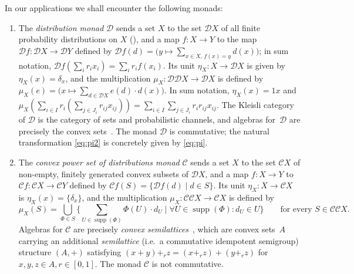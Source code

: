 \documentclass[a4paper, UKenglish, numberwithinsect, thm-restate, cleveref, final]{lipics-v2021}
\theoremstyle{plain}
\theoremstyle{definition}
\newcommand{\C}{\ensuremath{\mathcal{C}}}
\newcommand{\D}{\ensuremath{\mathcal{D}}}
\DeclareMathOperator{\supp}{supp}
\numberwithin{equation}{section}
\begin{document}
\begin{expl}\label{ex:monads}
In our applications we shall encounter the following monads:
\begin{enumerate}[(1)]
\item\label{ex:monads:D} The \emph{distribution monad} $\D$ sends a set $X$ to the set $\D X$
  of all finite probability distributions on $X$ (), and a map $f\colon
  X\to Y$ to the map \mbox{$\D f \colon \D X\to \D Y$} defined by $ \D f(d) =\big(y \mapsto
  \sum_{x\in X,\, f(x) = y} d(x)\big)$; in sum notation, $\D f(\sum_i r_ix_i)=\sum_i r_i
  f(x_i)$. Its unit \mbox{$\eta_X\colon X \to \D X$} is given by $\eta_X(x) = \delta_x$, and
  the multiplication $\mu_X\colon \D\D X \to \D X$ is defined by $\mu_X(e)=\big( x \mapsto \sum_{d\in \D X} e(d) \cdot d(x)\big)$. In sum notation,
  \(
    \eta_X(x)=1x\) and
    \(\mu_X(\sum_{i\in I} r_i(\sum_{j\in J_i} r_{ij}x_{ij}))
    =
    \sum_{i\in I}\sum_{j\in J_i} r_i r_{ij} x_{ij}\).
The Kleisli category of $\D$ is the category of sets and probabilistic channels, and
    algebras for~$\D$ are precisely the convex sets~\cite{swirszcz-74}. The monad $\D$ is commutative; the natural transformation \eqref{eq:pi2} is concretely given by \eqref{eq:pi}.

  \item\label{ex:monads:C} The \emph{convex power set of distributions monad} $\C$ sends a set
    $X$ to the set $\C X$ of non-empty, finitely generated convex subsets of $\D X$, and a map
    $f\colon X\to Y$ to $\C f\colon \C X\to \C Y$ defined by $\C f (S) = \{ \D f (d)\mid d\in
    S\}$. Its unit $\eta_X\colon X\to \C X$ is $\eta_X(x)=\{\delta_x\}$, and the multiplication
    $\mu_X\colon \C\C X\to \C X$ is defined by 
    \[
      \mu_X(S) = 
      \textstyle\bigcup_{\Phi\in S} \{\sum_{U \in \supp(\Phi)} \Phi(U) \cdot d_U \mid \forall U\in
      \supp(\Phi)\colon d_U\in U \}
      \qquad\text{for every $S\in \C\C X$}.
    \]
    Algebras for $\C$ are precisely \emph{convex
      semilattices}~\cite{bonchi-22}, which are convex sets~$A$ carrying an additional
    \emph{semilattice} (i.e.~a commutative idempotent semigroup) structure $(A,+)$ satisfying
    $(x+y)+_r z = (x+_r z) + (y+_r z)$ for $x,y,z\in A, r\in [0,1]$. The monad $\C$ is not
    commutative.
  

\end{enumerate}
\end{expl}
\end{document}
